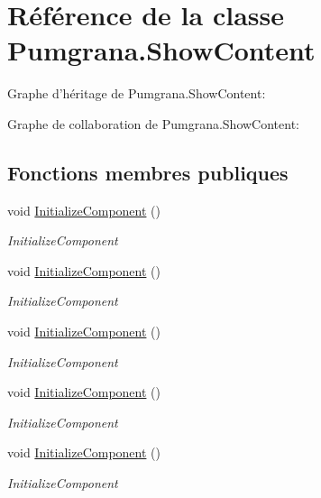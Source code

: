 \hypertarget{class_pumgrana_1_1_show_content}{\section{Référence de la classe Pumgrana.\+Show\+Content}
\label{class_pumgrana_1_1_show_content}
}


Graphe d'héritage de Pumgrana.\+Show\+Content\+:


Graphe de collaboration de Pumgrana.\+Show\+Content\+:
\subsection*{Fonctions membres publiques}
\begin{DoxyCompactItemize}
\item 
void \hyperlink{class_pumgrana_1_1_show_content_a705f41b53bc886cefddb019800d781a6}{Initialize\+Component} ()
\begin{DoxyCompactList}\small\item\em Initialize\+Component \end{DoxyCompactList}\item 
void \hyperlink{class_pumgrana_1_1_show_content_a705f41b53bc886cefddb019800d781a6}{Initialize\+Component} ()
\begin{DoxyCompactList}\small\item\em Initialize\+Component \end{DoxyCompactList}\item 
void \hyperlink{class_pumgrana_1_1_show_content_a705f41b53bc886cefddb019800d781a6}{Initialize\+Component} ()
\begin{DoxyCompactList}\small\item\em Initialize\+Component \end{DoxyCompactList}\item 
void \hyperlink{class_pumgrana_1_1_show_content_a705f41b53bc886cefddb019800d781a6}{Initialize\+Component} ()
\begin{DoxyCompactList}\small\item\em Initialize\+Component \end{DoxyCompactList}\item 
void \hyperlink{class_pumgrana_1_1_show_content_a705f41b53bc886cefddb019800d781a6}{Initialize\+Component} ()
\begin{DoxyCompactList}\small\item\em Initialize\+Component \end{DoxyCompactList}\item 

\end{DoxyCompactItemize}
